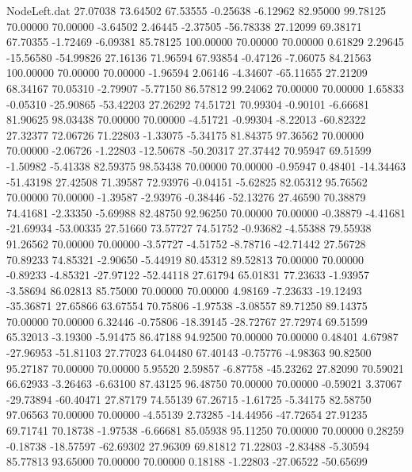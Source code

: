 \begin{filecontents}{NodeLeft.dat}
  27.07038   73.64502   67.53555    -0.25638   -6.12962   82.95000   99.78125   70.00000   70.00000   -3.64502    2.46445   -2.37505  -56.78338
  27.12099   69.38171   67.70355    -1.72469   -6.09381   85.78125  100.00000   70.00000   70.00000    0.61829    2.29645  -15.56580  -54.99826
  27.16136   71.96594   67.93854    -0.47126   -7.06075   84.21563  100.00000   70.00000   70.00000   -1.96594    2.06146   -4.34607  -65.11655
  27.21209   68.34167   70.05310    -2.79907   -5.77150   86.57812   99.24062   70.00000   70.00000    1.65833   -0.05310  -25.90865  -53.42203
  27.26292   74.51721   70.99304    -0.90101   -6.66681   81.90625   98.03438   70.00000   70.00000   -4.51721   -0.99304   -8.22013  -60.82322
  27.32377   72.06726   71.22803    -1.33075   -5.34175   81.84375   97.36562   70.00000   70.00000   -2.06726   -1.22803  -12.50678  -50.20317
  27.37442   70.95947   69.51599    -1.50982   -5.41338   82.59375   98.53438   70.00000   70.00000   -0.95947    0.48401  -14.34463  -51.43198
  27.42508   71.39587   72.93976    -0.04151   -5.62825   82.05312   95.76562   70.00000   70.00000   -1.39587   -2.93976   -0.38446  -52.13276
  27.46590   70.38879   74.41681    -2.33350   -5.69988   82.48750   92.96250   70.00000   70.00000   -0.38879   -4.41681  -21.69934  -53.00335
  27.51660   73.57727   74.51752    -0.93682   -4.55388   79.55938   91.26562   70.00000   70.00000   -3.57727   -4.51752   -8.78716  -42.71442
  27.56728   70.89233   74.85321    -2.90650   -5.44919   80.45312   89.52813   70.00000   70.00000   -0.89233   -4.85321  -27.97122  -52.44118
  27.61794   65.01831   77.23633    -1.93957   -3.58694   86.02813   85.75000   70.00000   70.00000    4.98169   -7.23633  -19.12493  -35.36871
  27.65866   63.67554   70.75806    -1.97538   -3.08557   89.71250   89.14375   70.00000   70.00000    6.32446   -0.75806  -18.39145  -28.72767
  27.72974   69.51599   65.32013    -3.19300   -5.91475   86.47188   94.92500   70.00000   70.00000    0.48401    4.67987  -27.96953  -51.81103
  27.77023   64.04480   67.40143    -0.75776   -4.98363   90.82500   95.27187   70.00000   70.00000    5.95520    2.59857   -6.87758  -45.23262
  27.82090   70.59021   66.62933    -3.26463   -6.63100   87.43125   96.48750   70.00000   70.00000   -0.59021    3.37067  -29.73894  -60.40471
  27.87179   74.55139   67.26715    -1.61725   -5.34175   82.58750   97.06563   70.00000   70.00000   -4.55139    2.73285  -14.44956  -47.72654
  27.91235   69.71741   70.18738    -1.97538   -6.66681   85.05938   95.11250   70.00000   70.00000    0.28259   -0.18738  -18.57597  -62.69302
  27.96309   69.81812   71.22803    -2.83488   -5.30594   85.77813   93.65000   70.00000   70.00000    0.18188   -1.22803  -27.06522  -50.65699

\end{filecontents}
